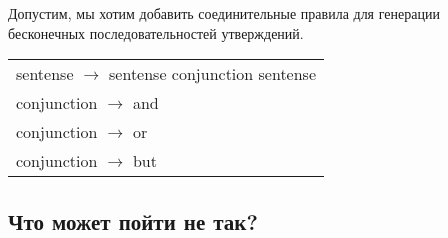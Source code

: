 \begin{frame}

	\frametitle{\insertsection}
	\framesubtitle{\insertsubsection}
	
	Допустим, мы хотим добавить соединительные правила для генерации бесконечных последовательностей утверждений.
	
	\begin{table}
		\centering
		\begin{tabular}{ l }
			\rowcolor{LightGray} sentense \(\rightarrow \) sentense conjunction sentense \\
			\rowcolor{LightGray} conjunction \(\rightarrow \) and \\
			\rowcolor{LightGray} conjunction \(\rightarrow \) or \\
			\rowcolor{LightGray} conjunction \(\rightarrow \) but \\
		\end{tabular}
	\end{table}
	

\end{frame}



\subsection{Что может пойти не так?}

